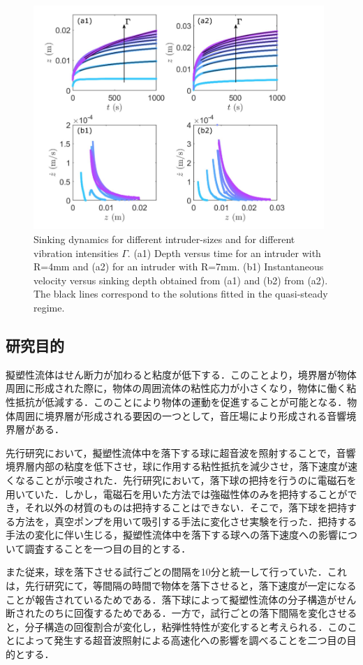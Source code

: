 \begin{center}
    \newpage
    \begin{figure}[h]
        \centering
        \includegraphics[width=11.0cm,clip]{1-Background/4-sinking.png}
        \caption{Sinking dynamics for different intruder-sizes and for different vibration intensities $\Gamma$. (a1) Depth versus time for an intruder with R=4mm and (a2) for an intruder with R=7mm. (b1) Instantaneous velocity versus sinking depth obtained from (a1) and (b2) from (a2). The black lines correspond to the solutions fitted in the quasi-steady regime\cite{ref:6}.}
        \label{fig:4-sinking}
    \end{figure}
\end{center}

\subsection{研究目的}

擬塑性流体はせん断力が加わると粘度が低下する．このことより，境界層が物体周囲に形成された際に，物体の周囲流体の粘性応力が小さくなり，物体に働く粘性抵抗が低減する．このことにより物体の運動を促進することが可能となる．物体周囲に境界層が形成される要因の一つとして，音圧場により形成される音響境界層がある\cite{ref:7}．

先行研究\cite{ref:8}において，擬塑性流体中を落下する球に超音波を照射することで，音響境界層内部の粘度を低下させ，球に作用する粘性抵抗を減少させ，落下速度が速くなることが示唆された．先行研究\cite{ref:8}において，落下球の把持を行うのに電磁石を用いていた．しかし，電磁石を用いた方法では強磁性体のみを把持することができ，それ以外の材質のものは把持することはできない．そこで，落下球を把持する方法を，真空ポンプを用いて吸引する手法に変化させ実験を行った．把持する手法の変化に伴い生じる，擬塑性流体中を落下する球への落下速度への影響について調査することを一つ目の目的とする．

また従来，球を落下させる試行ごとの間隔を10分と統一して行っていた．これは，先行研究\cite{ref:8-5}にて，等間隔の時間で物体を落下させると，落下速度が一定になることが報告されているためである．落下球によって擬塑性流体の分子構造がせん断されたのちに回復するためである．一方で，試行ごとの落下間隔を変化させると，分子構造の回復割合が変化し，粘弾性特性が変化すると考えられる．このことによって発生する超音波照射による高速化への影響を調べることを二つ目の目的とする．
